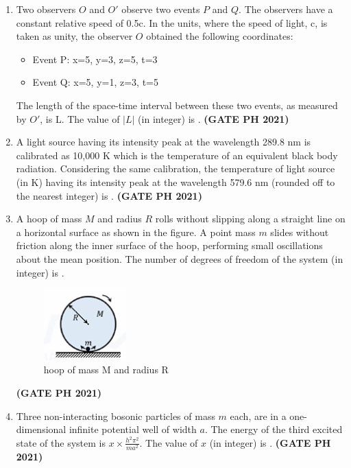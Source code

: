\documentclass[14pt, a4paper]{extarticle}
\begin{document}
\begin{enumerate}[label=\textbf{Q.\arabic*}]
\begin{enumerate}[label=\textbf{Q.\arabic*}]
\item Two observers $O$ and $O'$ observe two events $P$ and $Q$. The observers have a constant relative speed of 0.5c. In the units, where the speed of light, c, is taken as unity, the observer $O$ obtained the following coordinates:
\begin{itemize}
    \item[] Event P: x=5, y=3, z=5, t=3
    \item[] Event Q: x=5, y=1, z=3, t=5
\end{itemize}
The length of the space-time interval between these two events, as measured by $O'$, is L. The value of $|L|$ (in integer) is \underline{\hspace{3cm}}.
\hfill \textbf{(GATE PH 2021)}

\item A light source having its intensity peak at the wavelength 289.8 nm is calibrated as 10,000 K which is the temperature of an equivalent black body radiation. Considering the same calibration, the temperature of light source (in K) having its intensity peak at the wavelength 579.6 nm (rounded off to the nearest integer) is \underline{\hspace{3cm}}.
\hfill \textbf{(GATE PH 2021)}

\item A hoop of mass $M$ and radius $R$ rolls without slipping along a straight line on a horizontal surface as shown in the figure. A point mass $m$ slides without friction along the inner surface of the hoop, performing small oscillations about the mean position. The number of degrees of freedom of the system (in integer) is \underline{\hspace{3cm}}.
\begin{figure}[H]
\centering
\includegraphics[width=0.3\textwidth]{figs/q30fig21.png}
\caption{hoop of mass M and radius R}
\end{figure}
\hfill \textbf{(GATE PH 2021)}

\item Three non-interacting bosonic particles of mass $m$ each, are in a one-dimensional infinite potential well of width $a$. The energy of the third excited state of the system is $x \times \frac{h^2\pi^2}{ma^2}$. The value of $x$ (in integer) is \underline{\hspace{3cm}}.
\hfill \textbf{(GATE PH 2021)}


\end{enumerate}
\end{enumerate}
\end{document}
